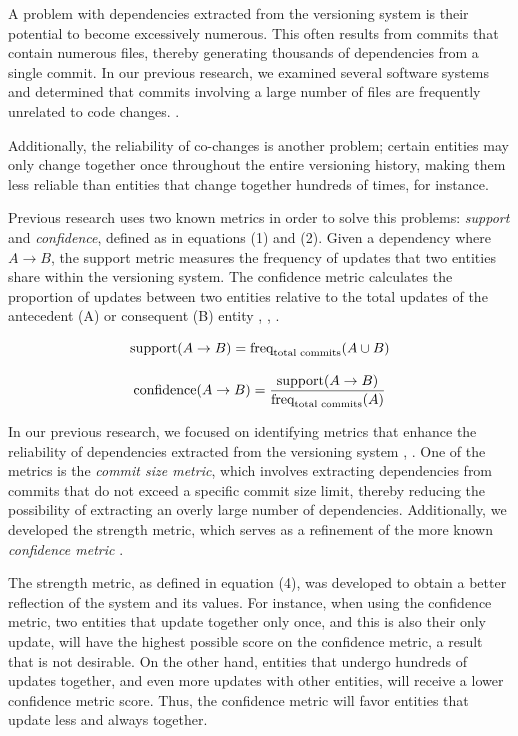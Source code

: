\documentclass[conference]{IEEEtran}
\begin{document}
A problem with dependencies extracted from the versioning system is their potential to become excessively numerous. This often results from commits that contain numerous files, thereby generating thousands of dependencies from a single commit.
In our previous research, we examined several software systems and determined that commits involving a large number of files are frequently unrelated to code changes. \cite{enase19}.

Additionally, the reliability of co-changes is another problem; certain entities may only change together once throughout the entire versioning history, making them less reliable than entities that change together hundreds of times, for instance. 

Previous research uses two known metrics in order to solve this problems: \textit{support} and \textit{confidence}, defined as in equations (1)  and (2). Given a dependency where $A \rightarrow B$, the support metric measures the frequency of updates that two entities share within the versioning system. The confidence metric calculates the proportion of updates between two entities relative to the total updates of the antecedent (A) or consequent (B) entity \cite{DBLP:conf/issre/OlivaG15}, \cite{DBLP:journals/jss/AjienkaC17}, \cite{Zimmermann:2004:MVH:998675.999460}.

\begin{equation}
\small
\text{support}(A \rightarrow B) = \text{freq}_{\text{total commits}}(A \cup B)
\end{equation}

\begin{equation}
\small
\text{confidence}(A \rightarrow B) = \frac{\text{support}(A \rightarrow B)}{\text{freq}_{\text{total commits}}(A)}
\end{equation}


In our previous research, we focused on identifying metrics that enhance the reliability of dependencies extracted from the versioning system \cite{saci19}, \cite{enase19}. One of the metrics is the \textit{commit size metric}, which involves extracting dependencies from commits that do not exceed a specific commit size limit, thereby reducing the possibility of extracting an overly large number of dependencies. Additionally, we developed the strength metric, which serves as a refinement of the more known \textit{confidence metric} \cite{articlekeyclass23}.


The strength metric, as defined in equation (4), was developed to obtain a better reflection of the system and its values. For instance, when using the confidence metric, two entities that update together only once, and this is also their only update, will have the highest possible score on the confidence metric, a result that is not desirable. On the other hand, entities that undergo hundreds of updates together, and even more updates with other entities, will receive a lower confidence metric score. Thus, the confidence metric will favor entities that update less and always together.
\end{document}
